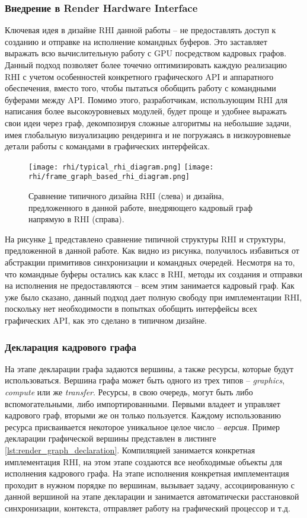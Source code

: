 \subsubsection{Внедрение в Render Hardware Interface}
Ключевая идея в дизайне RHI данной работы -- не предоставлять доступ к созданию и отправке на исполнение командных буферов. Это заставляет выражать всю вычислительную работу с GPU посредством кадровых графов. Данный подход позволяет более точечно оптимизировать каждую реализацию RHI с учетом особенностей конкретного графического API и аппаратного обеспечения, вместо того, чтобы пытаться обобщить работу с командными буферами между API. Помимо этого, разработчикам, использующим RHI для написания более высокоуровневых модулей, будет проще и удобнее выражать свои идеи через граф, декомпозируя сложные алгоритмы на небольшие задачи, имея глобальную визуализацию рендеринга и не погружаясь в низкоуровневые детали работы с командами в графических интерфейсах.

\begin{figure}[h]
    \centering
    \texttt{[image: rhi/typical\_rhi\_diagram.png]}
    \hfill
    \texttt{[image: rhi/frame\_graph\_based\_rhi\_diagram.png]}
    \caption{Сравнение типичного дизайна RHI (слева) и дизайна, предложенного в данной работе, внедряющего кадровый граф напрямую в RHI (справа).}
    \label{fig:rhi_design_comparison}
\end{figure}

На рисунке \ref{fig:rhi_design_comparison} представлено сравнение типичной структуры RHI и структуры, предложенной в данной работе. Как видно из рисунка, получилось избавиться от абстракции примитивов синхронизации и командных очередей. Несмотря на то, что командные буферы остались как класс в RHI, методы их создания и отправки на исполнения не предоставляются -- всем этим занимается кадровый граф. Как уже было сказано, данный подход дает полную свободу при имплементации RHI, поскольку нет необходимости в попытках обобщить интерфейсы всех графических API, как это сделано в типичном дизайне.

\subsubsection{Декларация кадрового графа}
На этапе декларации графа задаются вершины, а также ресурсы, которые будут использоваться. Вершина графа может быть одного из трех типов -- \textit{graphics}, \textit{compute} или же \textit{transfer}. Ресурсы, в свою очередь, могут быть либо вспомогательными, либо импортированными. Первыми владеет и управляет кадрового граф, вторыми же он только пользуется. Каждому использованию ресурса присваивается некоторое уникальное целое число -- \textit{версия}. Пример декларации графической вершины представлен в листинге \ref{lst:render_graph_declaration}. Компиляцией занимается конкретная имплементация RHI, на этом этапе создаются все необходимые объекты для исполнения кадрового графа. На этапе исполнения конкретная имплементация проходит в нужном порядке по вершинам, вызывает задачу, ассоциированную с данной вершиной на этапе декларации и занимается автоматически расстановкой синхронизации, контекста, отправляет работу на графический процессор и т.д.


